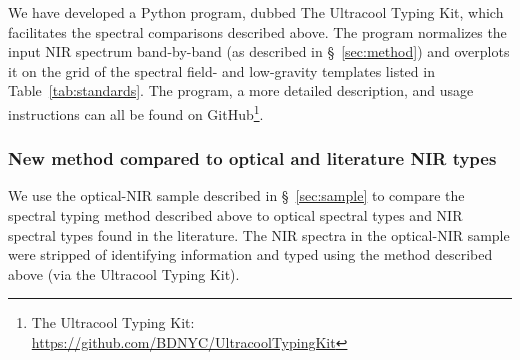 \documentclass[modern,trackchanges]{aastex61}
\begin{document}


We have developed a Python program, dubbed The Ultracool Typing Kit, which facilitates the spectral comparisons described above.
The program normalizes the input NIR spectrum band-by-band (as described in \S~\ref{sec:method}) and overplots it on the grid of the spectral field- and low-gravity templates listed in Table~\ref{tab:standards}.
The program, a more detailed description, and usage instructions can all be found on GitHub\footnote{The Ultracool Typing Kit: \url{https://github.com/BDNYC/UltracoolTypingKit}}.

\subsubsection{New method compared to optical and literature NIR types}

We use the optical-NIR sample described in \S~\ref{sec:sample} to compare the spectral typing method described above to optical spectral types and NIR spectral types found in the literature.
The NIR spectra in the optical-NIR sample were stripped of identifying information and typed using the method described above (via the Ultracool Typing Kit).
\end{document}
